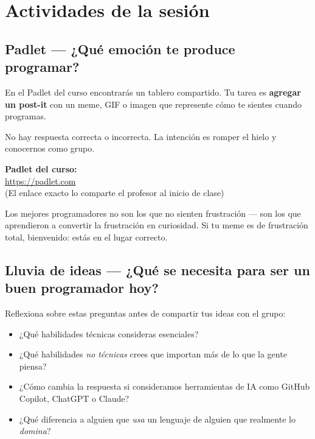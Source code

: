 \documentclass[12pt, oneside]{article}
\begin{document}
\section{Actividades de la sesión}

\subsection{Padlet — ¿Qué emoción te produce programar?}

En el Padlet del curso encontrarás un tablero compartido.
Tu tarea es \textbf{agregar un post-it} con un meme, GIF o imagen que
represente cómo te sientes cuando programas.

No hay respuesta correcta o incorrecta. La intención es romper el hielo
y conocernos como grupo.

\begin{center}
  \large\textbf{Padlet del curso:}\\[6pt]
  \url{https://padlet.com}\\[4pt]
  {\small (El enlace exacto lo comparte el profesor al inicio de clase)}
\end{center}

\begin{consejo}
  Los mejores programadores no son los que no sienten frustración —
  son los que aprendieron a convertir la frustración en curiosidad.
  Si tu meme es de frustración total, bienvenido: estás en el lugar correcto.
\end{consejo}

\subsection{Lluvia de ideas — ¿Qué se necesita para ser un buen programador hoy?}

Reflexiona sobre estas preguntas antes de compartir tus ideas con el grupo:

\begin{itemize}
  \item ¿Qué habilidades técnicas consideras esenciales?
  \item ¿Qué habilidades \textit{no técnicas} crees que importan más de lo que
        la gente piensa?
  \item ¿Cómo cambia la respuesta si consideramos herramientas de IA como
        GitHub Copilot, ChatGPT o Claude?
  \item ¿Qué diferencia a alguien que \textit{usa} un lenguaje de alguien que
        realmente lo \textit{domina}?
\end{itemize}
\end{document}
